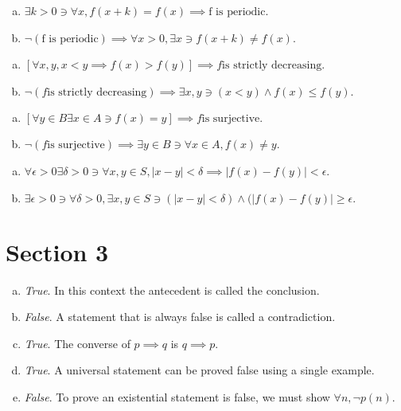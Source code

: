 \documentclass[12pt]{scrartcl} %
\begin{document}
\begin{enumerate}[(a)]
	\item $\exists k > 0 \ni \forall x, f(x + k) = f(x) \implies \text{f is periodic}$.
	\item $\neg(\text{f is periodic}) \implies \forall x > 0, \exists x \ni f(x + k) \neq f(x)$.
\end{enumerate}
\begin{enumerate}[(a)]
	\item $[\forall x, y, x < y \implies f(x) > f(y)] \implies f \text{is strictly decreasing}$.
	\item $\neg(f \text{is strictly decreasing}) \implies \exists x, y \ni (x < y) \land f(x) \leq f(y)$.
\end{enumerate}
\begin{enumerate}[(a)]
	\item $[\forall y \in B \exists x \in A \ni f(x) = y] \implies f \text{is surjective}.$
	\item $\neg(f \text{is surjective}) \implies \exists y \in B \ni \forall x \in A, f(x) \neq y$.
\end{enumerate}
\begin{enumerate}[(a)]
	\item $\forall \epsilon > 0 \exists \delta > 0 \ni \forall x, y \in S, \lvert x - y \rvert < \delta \implies \lvert f(x) - f(y) \rvert < \epsilon$.
	\item $\exists \epsilon > 0 \ni \forall \delta > 0, \exists x, y \in S \ni (\lvert x - y \rvert < \delta) \land (\lvert f(x) - f(y) \rvert \geq \epsilon.$
\end{enumerate}

\section{Section 3}
\begin{enumerate}[(a)]
	\item \emph{True}. In this context the antecedent is called the conclusion.
	\item \emph{False}. A statement that is always false is called a contradiction.
	\item \emph{True}. The converse of $p \implies q$ is $q \implies p$.
	\item \emph{True}. A universal statement can be proved false using a single example.
	\item \emph{False}. To prove an existential statement is false, we must show $\forall n, \neg p(n)$.
\end{enumerate}
\end{document}
